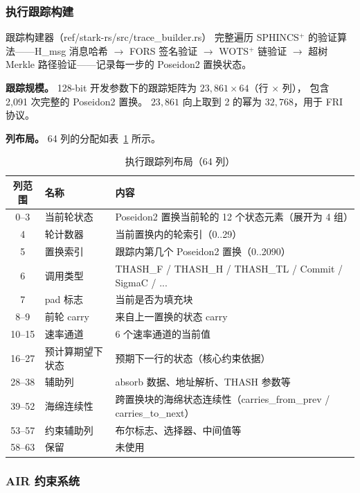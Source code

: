 \documentclass[11pt,a4paper]{ctexart}
\begin{document}
\subsubsection{执行跟踪构建}

跟踪构建器（ref/stark-rs/src/trace\_builder.rs）
完整遍历 SPHINCS$^+$ 的验证算法——H\_msg 消息哈希 $\rightarrow$
FORS 签名验证 $\rightarrow$ WOTS$^+$ 链验证 $\rightarrow$
超树 Merkle 路径验证——记录每一步的 Poseidon2 置换状态。

\textbf{跟踪规模。}
128-bit 开发参数下的跟踪矩阵为 $23{,}861 \times 64$（行 $\times$ 列），
包含 2,091 次完整的 Poseidon2 置换。
$23{,}861$ 向上取到 2 的幂为 $32{,}768$，用于 FRI 协议。

\textbf{列布局。}
64 列的分配如表~\ref{tab:columns} 所示。

\begin{table}[h]
\centering
\caption{执行跟踪列布局（64 列）}
\label{tab:columns}
\fontsize{8}{10}\selectfont
\begin{tabular}{@{}cll@{}}
\toprule
\textbf{列范围} & \textbf{名称} & \textbf{内容} \\
\midrule
0--3   & 当前轮状态     & Poseidon2 置换当前轮的 12 个状态元素（展开为 4 组） \\
4      & 轮计数器       & 当前置换内的轮索引（0..29） \\
5      & 置换索引       & 跟踪内第几个 Poseidon2 置换（0..2090） \\
6      & 调用类型       & THASH\_F / THASH\_H / THASH\_TL / Commit / SigmaC / ... \\
7      & pad 标志       & 当前是否为填充块 \\
8--9   & 前轮 carry     & 来自上一置换的状态 carry \\
10--15 & 速率通道       & 6 个速率通道的当前值 \\
16--27 & 预计算期望下状态 & 预期下一行的状态（核心约束依据） \\
28--38 & 辅助列         & absorb 数据、地址解析、THASH 参数等 \\
39--52 & 海绵连续性     & 跨置换块的海绵状态连续性（carries\_from\_prev / carries\_to\_next） \\
53--57 & 约束辅助列     & 布尔标志、选择器、中间值等 \\
58--63 & 保留           & 未使用 \\
\bottomrule
\end{tabular}
\end{table}

\subsubsection{AIR 约束系统}
\end{document}
